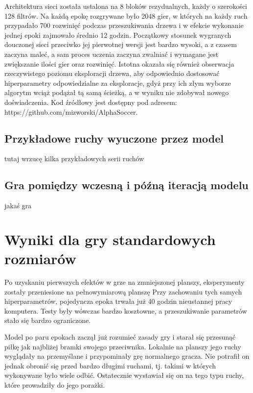 \documentclass[licencjacka]{pracamgr}
\begin{document}
Architektura sieci została ustalona na 8 bloków rezydualnych, każdy o szerokości 128 filtrów. Na każdą epokę rozgrywane było 2048 gier, w których na każdy ruch przypadało 700 rozwinięć podczas przeszukiwania drzewa i w efekcie wykonanie jednej epoki zajmowało średnio 12 godzin. Początkowy stosunek wygranych douczonej sieci przeciwko jej pierwotnej wersji jest bardzo wysoki, a z czasem zaczyna maleć, a sam proces uczenia zaczyna zwalniać i wymagane jest zwiększanie ilości gier oraz rozwinięć. Istotna okazała się również obserwacja rzeczywistego poziomu eksploracji drzewa, aby odpowiednio dostosować hiperparametry odpowiedzialne za eksploracje, gdyż przy ich złym wyborze algorytm wciąż podążał tą samą ścieżką, a w wyniku nie zdobywał nowego doświadczenia. Kod źródłowy jest dostępny pod adresem: https://github.com/mizworski/AlphaSoccer.

\subsection{Przykładowe ruchy wyuczone przez model}

tutaj wrzucę kilka przykładowych serii ruchów

\subsection{Gra pomiędzy wczesną i późną iteracją modelu}

jakaś gra

\section{Wyniki dla gry standardowych rozmiarów}

Po uzyskaniu pierwszych efektów w grze na zmniejszonej planszy, eksperymenty zostały przeniesione na pełnowymiarową planszę Przy zachowaniu tych samych hiperparametrów, pojedyncza epoka trwała już 40 godzin nieustannej pracy komputera. Testy były wówczas bardzo kosztowne, a przeszukiwanie parametrów stało się bardzo ograniczone. 

Model po paru epokach zaczął już rozumieć zasady gry i starał się przesunąć piłkę jak najbliżej bramki swojego przeciwnika. Lokalnie na planszy jego ruchy wyglądały na przemyślane i przypominały grę normalnego gracza. Nie potrafił on jednak obronić się przed bardzo długimi ruchami, tj. takimi w których wykonywane było wiele odbić. Ostatecznie wystawiał się on na tego typu ruchy, które prowadziły do jego porażki.
\end{document}
